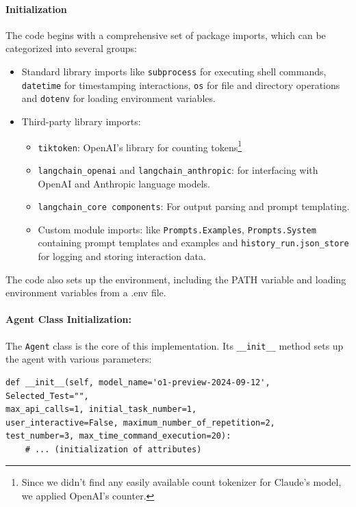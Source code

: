 \paragraph{Initialization}
The code begins with a comprehensive set of package imports, which can be categorized into several groups:
\begin{itemize}
    \item Standard library imports like \texttt{subprocess} for executing shell commands, \texttt{datetime} for timestamping interactions, \texttt{os} for file and directory operations and \texttt{dotenv} for loading environment variables.
    \item Third-party library imports:
    \begin{itemize}
        \item \texttt{tiktoken}: OpenAI's library for counting tokens\footnote{Since we didn't find any easily available count tokenizer for Claude's model, we applied OpenAI's counter.}
        \item \texttt{langchain\_openai} and \texttt{langchain\_anthropic}: for interfacing with OpenAI and Anthropic language models.
        \item \texttt{langchain\_core components}: For output parsing and prompt templating.
        
    \item Custom module imports: like \texttt{Prompts.Examples}, \texttt{Prompts.System} containing prompt templates and examples and \texttt{history\_run.json\_store} for logging and storing interaction data.
    \end{itemize}
\end{itemize}
The code also sets up the environment, including the PATH variable and loading environment variables from a .env file.

\paragraph{Agent Class Initialization:}
The \texttt{Agent} class is the core of this implementation. Its \texttt{\_\_init\_\_} method sets up the agent with various parameters:
\begin{verbatim}
def __init__(self, model_name='o1-preview-2024-09-12', Selected_Test="",
max_api_calls=1, initial_task_number=1,
user_interactive=False, maximum_number_of_repetition=2,
test_number=3, max_time_command_execution=20):
    # ... (initialization of attributes)
\end{verbatim}

